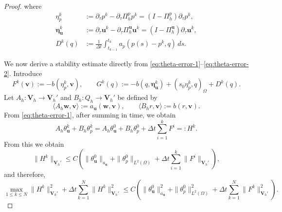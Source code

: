\documentclass{amsart}
\newcommand{\LRp}[1]{\left( #1 \right)}
\begin{document}
\begin{proof}
%
where 
%
\begin{align*}
        \eta_p^k
        &:=
        \partial_\tau p^k-\partial_\tau\Pi_h^p p^k
        =
        (I-\Pi_h^p)\partial_\tau p^k,
        \\
        \boldsymbol\eta_{\boldsymbol u}^k
        &:=
        \partial_\tau\boldsymbol u^k
        -
        \partial_\tau\Pi_h^{\boldsymbol u}\boldsymbol u^k
        =
        (I-\Pi_h^{\boldsymbol u})\partial_\tau\boldsymbol u^k,
        \\
        D^k(q)
        &:=
        \frac1{\Delta t}
        \int_{t_{k-1}}^{t_k}
        a_p(p(s)-p^k,q)\,ds.
\end{align*}
%

We now derive a stability estimate directly from
\eqref{eq:theta-error-1}--\eqref{eq:theta-error-2}. Introduce
\[
        F^k(\boldsymbol v):=-b(\eta_p^k,\boldsymbol v), \qquad G^k(q)
        :=
        -b(q,\boldsymbol\eta_{\boldsymbol u}^k)
        +
        (s_0\eta_p^k,q)_\Omega
        +
        D^k(q).
\]
Let $A_h:\boldsymbol V_h\to \boldsymbol V_h'$ and
$B_h:Q_h\to \boldsymbol V_h'$ be defined by
\[
        \langle A_h\boldsymbol w,\boldsymbol v\rangle
        :=
        a_{\boldsymbol u}(\boldsymbol w,\boldsymbol v),
        \qquad
        \langle B_h r,\boldsymbol v\rangle
        :=
        b(r,\boldsymbol v).
\]
From \eqref{eq:theta-error-1}, after summing in time, we obtain
\[
        A_h\theta_{\boldsymbol u}^k+B_h\theta_p^k
        = A_h\theta_{\boldsymbol u}^0+B_h\theta_p^0 + \Delta t\sum_{i=1}^k F^i =:
        H^k.
\]
From this we obtain
\[
        \|H^k\|_{\boldsymbol V_h'}
        \le C \LRp{ \|\theta_{\boldsymbol{u}}^0\|_{a_{\boldsymbol{u}}} + \|\theta_p^0\|_{L^2(\Omega)} + 
        \Delta t\sum_{i=1}^k \|F^i\|_{\boldsymbol V_h'}}, 
\]
%
and therefore,
%
\begin{equation}
\label{eq:H-bound-direct}
    \max_{1\le k\le N}\|H^k\|_{\boldsymbol V_h'}^2
    +
    \Delta t\sum_{k=1}^N\|H^k\|_{\boldsymbol V_h'}^2
    \le
    C\left(
    \|\theta_{\boldsymbol u}^0\|_{a_{\boldsymbol u}}^2
    +
    \|\theta_p^0\|_{L^2(\Omega)}^2
    +
    \Delta t\sum_{k=1}^N\|F^k\|_{\boldsymbol V_h'}^2
    \right). 
\end{equation}


\end{proof}
\end{document}
